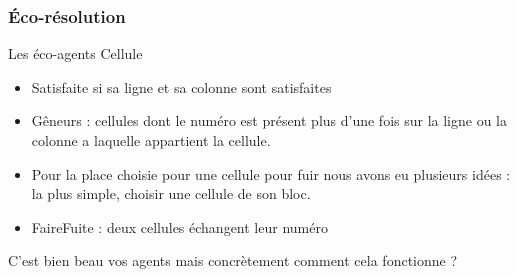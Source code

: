 \begin{frame}
    \frametitle{Éco-résolution}
    \begin{block}{Les éco-agents Cellule}
    		\begin{itemize}
    			\item Satisfaite si sa ligne et sa colonne sont satisfaites
    			\item Gêneurs : cellules dont le numéro est présent plus d'une fois sur la ligne ou la colonne a laquelle appartient la cellule.
    			\item Pour la place choisie pour une cellule pour fuir nous avons eu plusieurs idées : la plus simple, choisir une cellule de son bloc.
    			\item FaireFuite : deux cellules échangent leur numéro
    		\end{itemize}
    \end{block}
    \pause
    \begin{alertblock}{}
		C'est bien beau vos agents mais concrètement comment cela fonctionne ? 	
	\end{alertblock}
\end{frame}

